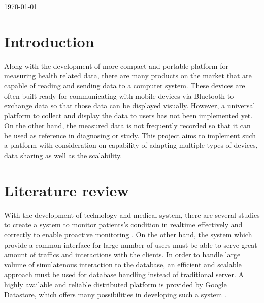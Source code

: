 \begin{titlepage}


{\large \today}\\[2cm] %



\vfill %

\end{titlepage}

\linespread{1.25}
\section{Introduction}
Along with the development of more compact and portable platform for measuring health related data, there are many
products on the market that are capable of reading and sending data to a computer system. These devices are often built
ready for communicating with mobile devices via Bluetooth to exchange data so that those data can be displayed visually.
However, a universal platform to collect and display the data to users has not been implemented yet. On the other hand,
the measured data is not frequently recorded so that it can be used as reference in diagnosing or study.  This project
aims to implement such a platform with consideration on capability of adapting multiple types of devices, data sharing
as well as the scalability.

\section{Literature review}
With the development of technology and medical system, there are several studies to create a system to monitor
patients's condition in realtime effectively and correctly to enable proactive monitoring \cite{5076774}. On the other
hand, the system which provide a common interface for large number of users must be able to serve great amount of
traffics and interactions with the clients.  In order to handle large volume of simulatenous interaction to the
database, an efficient and scalable approach must be used for database handling instead of traditional server. A highly
available and reliable distributed platform is provided by Google Datastore, which offers many possibilities in
developing such a system \cite{7059154}.

